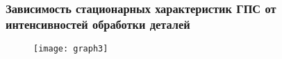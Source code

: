 
\begin{frame} \frametitle{Зависимость стационарных характеристик ГПС от интенсивностей обработки деталей}
\begin{figure}[H]
  \centering
  \texttt{[image: graph3]}
  \label{fig:main}
\end{figure}
\end{frame}
